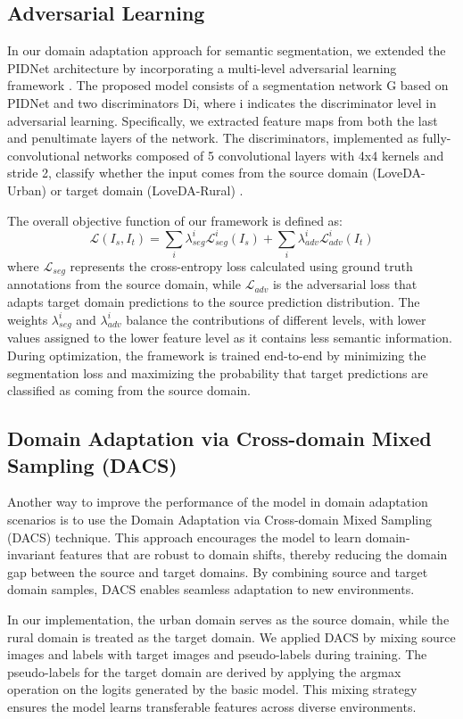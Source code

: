 \documentclass[10pt,twocolumn,letterpaper]{article}
\begin{document}
\subsection{Adversarial Learning}
In our domain adaptation approach for semantic segmentation, we extended the PIDNet \cite{feng2021pidnet} architecture by incorporating a multi-level adversarial learning framework \cite{tsai2018advlearning}. The proposed model consists of a segmentation network G based on PIDNet and two discriminators Di, where i indicates the discriminator level in adversarial learning. Specifically, we extracted feature maps from both the last and penultimate layers of the network. The discriminators, implemented as fully-convolutional networks composed of 5 convolutional layers with 4x4 kernels and stride 2, classify whether the input comes from the source domain (LoveDA-Urban) or target domain (LoveDA-Rural) \cite{wang2021loveda}.

The overall objective function of our framework is defined as:
$$
    \mathcal{L}(I_s, I_t) = \sum_i \lambda_{seg}^i \mathcal{L}_{seg}^i(I_s) + \sum_i \lambda_{adv}^i \mathcal{L}_{adv}^i(I_t)
$$
where $\mathcal{L}_{seg}$ represents the cross-entropy loss calculated using ground truth annotations from the source domain, while $\mathcal{L}_{adv}$ is the adversarial loss that adapts target domain predictions to the source prediction distribution. The weights $\lambda_{seg}^i$ and $\lambda_{adv}^i$ balance the contributions of different levels, with lower values assigned to the lower feature level as it contains less semantic information. During optimization, the framework is trained end-to-end by minimizing the segmentation loss and maximizing the probability that target predictions are classified as coming from the source domain.

\subsection{Domain Adaptation via Cross-domain Mixed Sampling (DACS)}

Another way to improve the performance of the model in domain adaptation scenarios is to use the Domain Adaptation via Cross-domain Mixed Sampling (DACS) technique. This approach encourages the model to learn domain-invariant features that are robust to domain shifts, thereby reducing the domain gap between the source and target domains. By combining source and target domain samples, DACS enables seamless adaptation to new environments.

In our implementation, the urban domain serves as the source domain, while the rural domain is treated as the target domain. We applied DACS by mixing source images and labels with target images and pseudo-labels during training. The pseudo-labels for the target domain are derived by applying the argmax operation on the logits generated by the basic model. This mixing strategy ensures the model learns transferable features across diverse environments.
\end{document}
